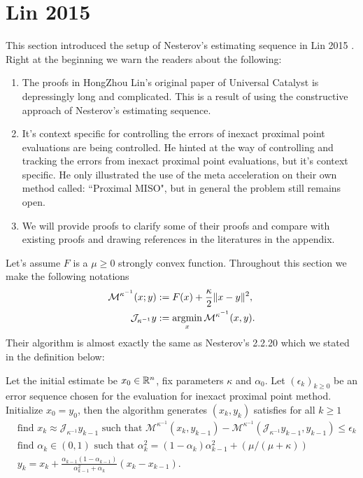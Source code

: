 \documentclass[12pt]{article}
\begin{document}
\section{Lin 2015}
    This section introduced the setup of Nesterov's estimating sequence in Lin 2015 \cite{lin_universal_2015}. 
    Right at the beginning we warn the readers about the following: 
    \begin{enumerate}
        \item The proofs in HongZhou Lin's original paper of Universal Catalyst is depressingly long and complicated. This is a result of using the constructive approach of Nesterov's estimating sequence. 
        \item It's context specific for controlling the errors of inexact proximal point evaluations are being controlled. He hinted at the way of controlling and tracking the errors from inexact proximal point evaluations, but it's context specific. He only illustrated the use of the meta acceleration on their own method called: ``Proximal MISO", but in general the problem still remains open. 
        \item We will provide proofs to clarify some of their proofs and compare with existing proofs and drawing references in the literatures in the appendix. 
    \end{enumerate}
    Let's assume $F$ is a $\mu \ge 0$ strongly convex function. 
    Throughout this section we make the following notations
    \begin{align*}
        \mathcal M^{\kappa^{-1}}(x; y) &:= F(x) + \frac{\kappa}{2}\Vert x - y\Vert^2, 
        \\
        \mathcal J_{\kappa^{-1}} y &:= \mathop{\rm argmin}\limits_x \mathcal M^{\kappa^{-1}} (x, y). 
    \end{align*}
    Their algorithm is almost exactly the same as Nesterov's 2.2.20 \cite{nesterov_lectures_2018} which we stated in the definition below: 
    \begin{definition}
        Let the initial estimate be $x_0 \in \mathbb R^n$, fix parameters $\kappa$ and $\alpha_0$. 
        Let $(\epsilon_k)_{k \ge 0}$ be an error sequence chosen for the evaluation for inexact proximal point method. 
        Initialize $x_0 = y_0$, then the algorithm generates $(x_k, y_k)$ satisfies for all $k \ge 1$
        \begin{align*}
            & \text{find } x_k \approx \mathcal J_{\kappa^{-1}} y_{k - 1} \text{ such that } \mathcal M^{\kappa^{-1}}(x_k, y_{k - 1}) - \mathcal M^{\kappa^{-1}}(\mathcal J_{\kappa^{-1}}y_{k - 1}, y_{k - 1}) \le \epsilon_k
            \\
            & \text{find } \alpha_k \in (0, 1) \text{ such that } \alpha_k^2 = (1 - \alpha_k)\alpha_{k - 1}^2 + (\mu/(\mu + \kappa)) 
            \\
            & 
            y_{k} = x_k + \frac{\alpha_{k - 1}(1 - \alpha_{k - 1})}{\alpha_{k - 1}^2 + \alpha_k}(x_k - x_{k - 1}). 
        \end{align*}
    \end{definition}
\end{document}
